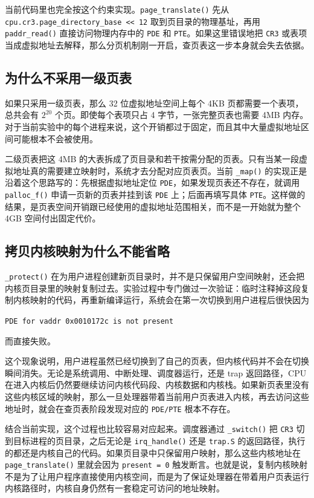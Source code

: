 \documentclass[a4paper]{article}
\begin{document}
当前代码里也完全按这个约束实现。\texttt{page\_translate()} 先从 \texttt{cpu.cr3.page\_directory\_base << 12} 取到页目录的物理基址，再用 \texttt{paddr\_read()} 直接访问物理内存中的 \texttt{PDE} 和 \texttt{PTE}。如果这里错误地把 \texttt{CR3} 或表项当成虚拟地址去解释，那么分页机制刚一开启，查页表这一步本身就会失去依据。

\subsection{为什么不采用一级页表}
如果只采用一级页表，那么 32 位虚拟地址空间上每个 4KB 页都需要一个表项，总共会有 \(2^{20}\) 个页。即使每个表项只占 4 字节，一张完整页表也需要 4MB 内存。对于当前实验中的每个进程来说，这个开销都过于固定，而且其中大量虚拟地址区间可能根本不会被使用。

二级页表把这 4MB 的大表拆成了页目录和若干按需分配的页表。只有当某一段虚拟地址真的需要建立映射时，系统才去分配对应页表页。当前 \texttt{\_map()} 的实现正是沿着这个思路写的：先根据虚拟地址定位 \texttt{PDE}，如果发现页表还不存在，就调用 \texttt{palloc\_f()} 申请一页新的页表并挂到该 \texttt{PDE} 上；后面再填写具体 \texttt{PTE}。这样做的结果，是页表空间开销跟已经使用的虚拟地址范围相关，而不是一开始就为整个 4GB 空间付出固定代价。

\subsection{拷贝内核映射为什么不能省略}
\texttt{\_protect()} 在为用户进程创建新页目录时，并不是只保留用户空间映射，还会把内核页目录里的映射复制过去。实验过程中专门做过一次验证：临时注释掉这段复制内核映射的代码，再重新编译运行，系统会在第一次切换到用户进程后很快因为
\begin{center}
\texttt{PDE for vaddr 0x0010172c is not present}
\end{center}
而直接失败。

这个现象说明，用户进程虽然已经切换到了自己的页表，但内核代码并不会在切换瞬间消失。无论是系统调用、中断处理、调度器运行，还是 trap 返回路径，CPU 在进入内核后仍然要继续访问内核代码段、内核数据和内核栈。如果新页表里没有这些内核区域的映射，那么一旦处理器带着当前用户页表进入内核，再去访问这些地址时，就会在查页表阶段发现对应的 \texttt{PDE/PTE} 根本不存在。

结合当前实现，这个过程也比较容易对应起来。调度器通过 \texttt{\_switch()} 把 \texttt{CR3} 切到目标进程的页目录，之后无论是 \texttt{irq\_handle()} 还是 \texttt{trap.S} 的返回路径，执行的都还是内核自己的代码。如果页目录中只保留用户映射，那么这些内核地址在 \texttt{page\_translate()} 里就会因为 \texttt{present = 0} 触发断言。也就是说，复制内核映射不是为了让用户程序直接使用内核空间，而是为了保证处理器在带着用户页表运行内核路径时，内核自身仍然有一套稳定可访问的地址映射。
\end{document}
